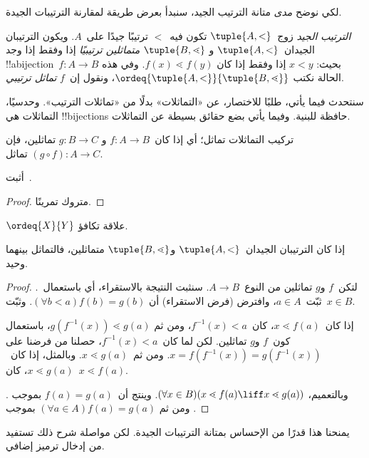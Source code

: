 \documentclass[../../../include/open-logic-section]{subfiles}
\begin{document}

لكي نوضح \emph{مدى} متانة الترتيب الجيد، سنبدأ بعرض طريقة لمقارنة
الترتيبات الجيدة.

\begin{defn}
\emph{الترتيب الجيد} زوج~$\tuple{A, <}$ تكون فيه~$<$ ترتيبًا جيدًا
على~$A$. ويكون الترتيبان الجيدان~$\tuple{A, <}$ و
$\tuple{B, \lessdot}$ \emph{متماثلين ترتيبيًا} إذا وفقط إذا وجد
!!a{bijection}~$f \colon A \to B$ بحيث: $x < y$ إذا وفقط إذا كان
$f(x) \lessdot f(y)$. وفي هذه الحالة نكتب
$\ordeq{\tuple{A, <}}{\tuple{B, \lessdot}}$، ونقول إن~$f$
\emph{تماثل ترتيبي}.
\end{defn}
\noindent
سنتحدث فيما يأتي، طلبًا للاختصار، عن «التماثلات» بدلًا من «تماثلات
الترتيب». وحدسيًا، التماثلات هي !!{bijection}s حافظة للبنية. وفيما
يأتي بضع حقائق بسيطة عن التماثلات.

\begin{lem}
تركيب التماثلات تماثل؛ أي إذا كان~$f \colon A \to B$ و
$g \colon B \to C$ تماثلين، فإن
$(g \circ f) \colon A \to C$ تماثل.
\end{lem}
\begin{prob}
	أثبت~.
\end{prob}
\begin{proof}
متروك تمرينًا.
\end{proof}
\begin{cor}
	$\ordeq{X}{Y}$ علاقة تكافؤ.
\end{cor}
\begin{prop}
إذا كان الترتيبان الجيدان~$\tuple{A, <}$ و$\tuple{B, \lessdot}$
متماثلين، فالتماثل بينهما وحيد.
\end{prop}

\begin{proof}
لتكن~$f$ و$g$ تماثلين من النوع~$A \to B$. سنثبت النتيجة بالاستقراء، أي
باستعمال~.
ثبّت~$a\in A$، وافترض (فرض الاستقراء) أن
$(\forall b < a)f(b) = g(b)$. وثبّت~$x \in B$.

إذا كان~$x \lessdot f(a)$، كان~$f^{-1}(x) < a$، ومن ثم
$g(f^{-1}(x)) \lessdot g(a)$، باستعمال كون~$f$ و$g$ تماثلين. لكن لما
كان~$f^{-1}(x) < a$، حصلنا من فرضنا على
$x =f(f^{-1}(x)) = g(f^{-1}(x))$. ومن ثم~$x \lessdot g(a)$. وبالمثل،
إذا كان~$x \lessdot g(a)$، كان~$x \lessdot f(a)$.

وبالتعميم، $(\forall x \in B)(x \lessdot f(a) \liff x \lessdot
g(a))$. وينتج أن~$f(a) = g(a)$ بموجب
. ومن ثم
$(\forall a \in A)f(a) = g(a)$ بموجب
.
\end{proof}\noindent
يمنحنا هذا قدرًا من الإحساس بمتانة الترتيبات الجيدة. لكن مواصلة شرح
ذلك تستفيد من إدخال ترميز إضافي.
\end{document}
